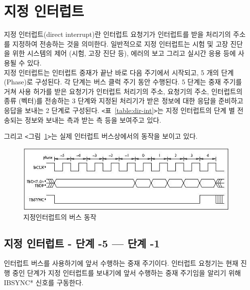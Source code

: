 \section{지정 인터럽트}
지정 인터럽트(direct interrupt)란
인터럽트 요청기가 인터럽트를 받을 처리기의 주소를 지정하여 전송하는 것을 의미한다.
일반적으로 지정 인터럽트는 시험 및 고장 진단을 위한 시스템의 제어 (시험, 고장 진단 등), 
에러의 보고 그리고 실시간 응용 등에 사용될 수 있다. \\
지정 인터럽트는 인터럽트 중재가 끝난 바로 다음 주기에서 시작되고, 5 개의 단계 (Phase)로 구성된다.
각 단계는 버스 클럭 주기 동안 수행된다.
5 단계는 중재 주기를 거쳐 사용 허가를 받은 요청기가
인터럽트 처리기의 주소, 요청기의 주소, 인터럽트의 종류 (벡터)를 전송하는 3 단계와
지정된 처리기가 받은 정보에 대한 응답을 준비하고 응답을 보내는 2 단계로 구성된다.
{\tt <}표~\ref{table:dir-int}{\tt >}는 지정 인터럽트의
단계 별 전송되는 정보와 보내는 측과 받는 측 등을 보여주고 있다.

그리고 {\tt <}그림~\ref{figure:dir-int}{\tt >}는 실제
인터럽트 버스상에서의 동작을 보이고 있다.
%
\begin{figure}[htb]
    \centerline{\includegraphics{ch4/FIG/dir-int.jpg}}
   \caption{지정인터럽트의 버스 동작}\label{figure:dir-int}
\end{figure}
%
%
\subsection*{지정 인터럽트 - 단계 -5 --- 단계 -1}
인터럽트 버스를 사용하기에 앞서 수행하는 중재 주기이다.
인터럽트 요청기는 현재 진행 중인 단계가 지정 인터럽트를 보내기에 앞서 수행하는 중재 주기임을
알리기 위해 IBSYNC* 신호를 구동한다.
%
